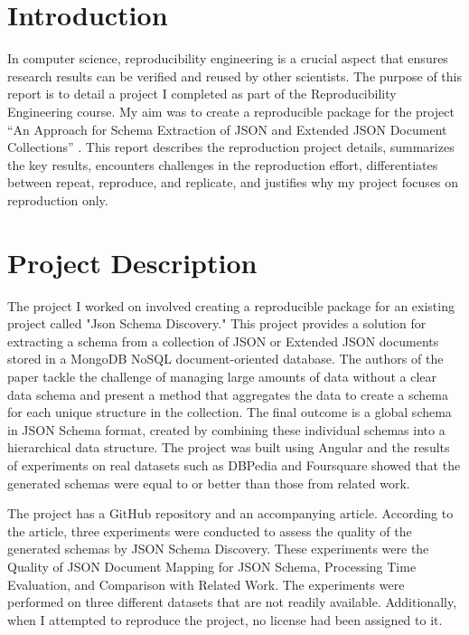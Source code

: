 \documentclass[sigconf]{acmart}
\begin{document}
\section{Introduction}
In computer science, reproducibility engineering is a crucial aspect that ensures research results can be verified and reused by other scientists. The purpose of this report is to detail a project I completed as part of the Reproducibility Engineering course. My aim was to create a reproducible package for the project ``An Approach for Schema Extraction of JSON and Extended JSON Document Collections'' \cite{8424731}. This report describes the reproduction project details, summarizes the key results, encounters challenges in the reproduction effort, differentiates between repeat, reproduce, and replicate, and justifies why my project focuses on reproduction only.


\section{Project Description}
The project I worked on involved creating a reproducible package for an existing project called "Json Schema Discovery." This project provides a solution for extracting a schema from a collection of JSON or Extended JSON documents stored in a MongoDB NoSQL document-oriented database. The authors of the paper tackle the challenge of managing large amounts of data without a clear data schema and present a method that aggregates the data to create a schema for each unique structure in the collection. The final outcome is a global schema in JSON Schema format, created by combining these individual schemas into a hierarchical data structure. The project was built using Angular and the results of experiments on real datasets such as DBPedia and Foursquare showed that the generated schemas were equal to or better than those from related work.

The project has a GitHub repository and an accompanying article. According to the article, three experiments were conducted to assess the quality of the generated schemas by JSON Schema Discovery. These experiments were the Quality of JSON Document Mapping for JSON Schema, Processing Time Evaluation, and Comparison with Related Work. The experiments were performed on three different datasets that are not readily available. Additionally, when I attempted to reproduce the project, no license had been assigned to it.
\end{document}
